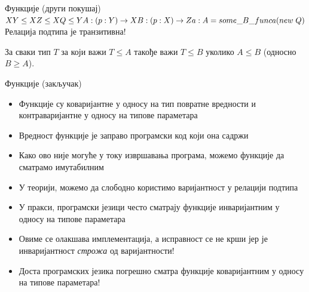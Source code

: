 \documentclass[xcolor=table]{beamer}
\begin{document}
    \begin{frame}{Функције (други покушај)}
        \begin{math}
X
\newline
Y \le X
\newline
Z \le X
\newline
Q \le Y
\newline
A: (p: Y) \to X
\newline
B: (p: X) \to Z
\newline
\newline
a: A = some\_B\_func
\newline
a(new\;Q)
\newline
\newline
        \end{math}
Релација подтипа је транзитивна!

За сваки тип \begin{math}T\end{math} за који важи \begin{math}T \leq A\end{math} такође важи \begin{math}T \leq B\end{math} уколико \begin{math}A \leq B\end{math} (односно \begin{math}B \geq A\end{math}).
    \end{frame}
    
    \begin{frame}{Функције (закључак)}
        \begin{itemize}
            \item Функције су коваријантне у односу на тип повратне вредности и контраваријантне у односу на типове параметара
            \item Вредност функције је заправо програмски код који она садржи
            \item Како ово није могуће у току извршавања програма, можемо функције да сматрамо имутабилним
            \item У теорији, можемо да слободно користимо варијантност у релацији подтипа
            \item У пракси, програмски језици често сматрају функције инваријантним у односу на типове параметара
            \item Овиме се олакшава имплементација, а исправност се не крши јер је инваријантност \textit{строжа} од варијантности!
            \item Доста програмских језика погрешно сматра функције коваријантним у односу на типове параметара! 
        \end{itemize}
    \end{frame}
\end{document}
